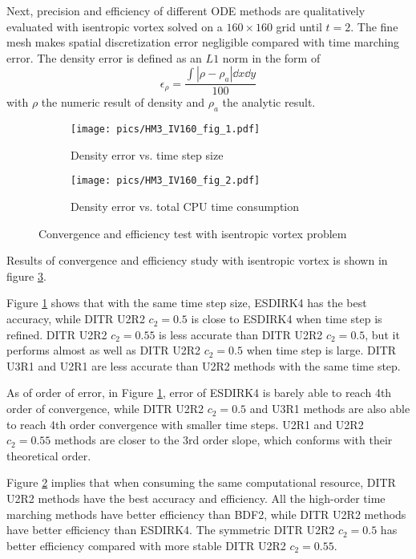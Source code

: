 Next, precision and efficiency of different ODE methods are
qualitatively evaluated with isentropic vortex solved on a $160\times160$
grid until $t=2$.
The fine mesh makes spatial
discretization error negligible compared with
time marching error.
The density error is defined as an $L1$ norm in the form of
\begin{equation}
    \epsilon_\rho = \frac{\int{|\rho-\rho_a| \dd x\dd y}}{
        100
    }
\end{equation}
with  $\rho$ the numeric result of density
and $\rho_a$ the analytic result.



\begin{figure}[htbp]
    \centering
    \begin{subfigure}{0.5\textwidth}
        \texttt{[image: pics/HM3\_IV160\_fig\_1.pdf]}
        \caption[]{Density error vs. time step size }
        \label{sfig:IVTests_Conv}
    \end{subfigure}\hfill
    \begin{subfigure}{0.5\textwidth}
        \texttt{[image: pics/HM3\_IV160\_fig\_2.pdf]}
        \caption[]{Density error vs. total CPU time consumption}
        \label{sfig:IVTests_Eff}
    \end{subfigure}
    \caption[]{Convergence and efficiency test with isentropic vortex problem}
    \label{fig:IVTests}
\end{figure}

Results of convergence and efficiency study with isentropic vortex is
shown in figure \ref{fig:IVTests}.

Figure \ref{sfig:IVTests_Conv} shows that with the same time step size,
ESDIRK4 has the best accuracy, while DITR U2R2 $c_2=0.5$ is close to
ESDIRK4 when time step is refined. DITR U2R2 $c_2=0.55$ is less accurate
than DITR U2R2 $c_2=0.5$, but it performs almost as well as
DITR U2R2 $c_2=0.5$ when time step is large.
DITR U3R1 and U2R1 are less accurate than U2R2 methods with
the same time step.

As of order of error, in Figure \ref{sfig:IVTests_Conv},
error of ESDIRK4 is barely able to reach 4th order of convergence,
while DITR U2R2 $c_2=0.5$ and U3R1 methods are also able to reach
4th order convergence with smaller time steps. U2R1 and U2R2 $c_2=0.55$
methods are closer to the 3rd order slope, which conforms with
their theoretical order.

Figure \ref{sfig:IVTests_Eff}
implies that when consuming the same computational resource,
DITR U2R2 methods have the best accuracy and efficiency.
All the high-order
time marching methods have better efficiency than BDF2,
while DITR U2R2 methods have better efficiency than ESDIRK4.
The symmetric DITR U2R2 $c_2=0.5$ has better efficiency
compared with more stable DITR U2R2 $c_2=0.55$.


